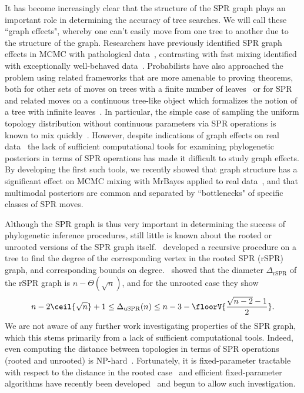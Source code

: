 \documentclass[11pt,onecolumn,conference]{IEEEtran}
\begin{document}
It has become increasingly clear that the structure of the SPR graph plays an important role in determining the accuracy of tree searches.
We will call these ``graph effects", whereby one can't easily move from one tree to another due to the structure of the graph.
Researchers have previously identified SPR graph effects in MCMC with pathological data~\cite{Mossel2005-ly,Mossel2006-fo,Ronquist2006-fv}, contrasting with fast mixing identified with exceptionally well-behaved data~\cite{Stefankovic2011-hu}.
Probabilists have also approached the problem using related frameworks that are more amenable to proving theorems, both for other sets of moves on trees with a finite number of leaves~\cite{Aldous2000-vg,Diaconis2002-gy} or for SPR and related moves on a continuous tree-like object which formalizes the notion of a tree with infinite leaves~\cite{Evans2006-xh,Athreya2014-de}.
In particular, the simple case of sampling the uniform topology distribution without continuous parameters via SPR operations is known to mix quickly~\cite{spade2014note}.
However, despite indications of graph effects on real data~\cite{beiko2006searching, lakner2008efficiency} the lack of sufficient computational tools for examining phylogenetic posteriors in terms of SPR operations has made it difficult to study graph effects.
By developing the first such tools, we recently showed that graph structure has a significant effect on MCMC mixing with MrBayes applied to real data~\cite{Whidden2015-yi}, and that multimodal posteriors are common and separated by ``bottlenecks" of specific classes of SPR moves.

Although the SPR graph is thus very important in determining the success of phylogenetic inference procedures, still little is known about the rooted or unrooted versions of the SPR graph itself.
\cite{Song2003-gf}~developed a recursive procedure on a tree to find the degree of the corresponding vertex in the rooted SPR (rSPR) graph, and corresponding bounds on degree.
\cite{Ding2011-bj}~showed that the diameter $\Delta_{\text{rSPR}}$ of the rSPR graph is $n - \Theta(\sqrt n)$, and for the unrooted case they show
$$ n - 2\ceil{\sqrt{n}} + 1
\le \Delta_{\text{uSPR}}(n)
\le n - 3 - \floorV{\frac{\sqrt{n - 2} - 1}{2}}.
$$
We are not aware of any further work investigating properties of the SPR graph, which this stems primarily from a lack of sufficient computational tools.
Indeed, even computing the distance between topologies in terms of SPR operations (rooted and unrooted) is NP-hard~\cite{bordewich05,hickey2008sdc}.
Fortunately, it is fixed-parameter tractable with respect to the distance in the rooted case~\cite{bordewich05} and efficient fixed-parameter algorithms have recently been developed~\cite{whidden2013hybridization,Whidden2015-yi} and begun to allow such investigation.
\end{document}
